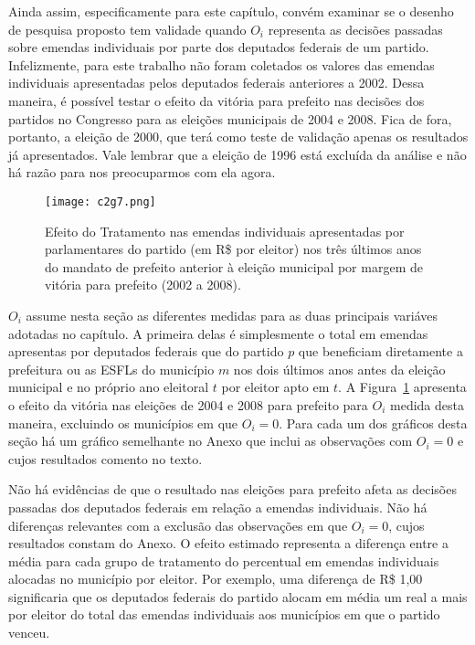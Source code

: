 Ainda assim, especificamente para este capítulo, convém examinar se o desenho de pesquisa proposto tem validade quando $O_{i}$ representa as decisões passadas sobre emendas individuais por parte dos deputados federais de um partido. Infelizmente, para este trabalho não foram coletados os valores das emendas individuais apresentadas pelos deputados federais anteriores a 2002. Dessa maneira, é possível testar o efeito da vitória para prefeito nas decisões dos partidos no Congresso para as eleições municipais de 2004 e 2008. Fica de fora, portanto, a eleição de 2000, que terá como teste de validação apenas os resultados já apresentados. Vale lembrar que a eleição de 1996 está excluída da análise e não há razão para nos preocuparmos com ela agora.

\begin{figure}[htp]
	\centering
	\texttt{[image: c2g7.png]}
	\caption{Efeito do Tratamento nas emendas individuais apresentadas por parlamentares do partido (em R\$ por eleitor) nos três últimos anos do mandato de prefeito anterior à eleição municipal por margem de vitória para prefeito (2002 a 2008).}
	\label{fig:c2g7}
\end{figure}

$O_{i}$ assume nesta seção as diferentes medidas para as duas principais variáves adotadas no capítulo. A primeira delas é simplesmente o total em emendas apresentas por deputados federais que do partido $p$ que beneficiam diretamente a prefeitura ou as ESFLs do município $m$ nos dois últimos anos antes da eleição municipal e no próprio ano eleitoral $t$ por eleitor apto em $t$. A Figura~\ref{fig:c2g7} apresenta o efeito da vitória nas eleições de 2004 e 2008 para prefeito para $O_{i}$ medida desta maneira, excluindo os municípios em que $O_{i}=0$. Para cada um dos gráficos desta seção há um gráfico semelhante no Anexo que inclui as observações com $O_{i}=0$ e cujos resultados comento no texto.

Não há evidências de que o resultado nas eleições para prefeito afeta as decisões passadas dos deputados federais em relação a emendas individuais. Não há diferenças relevantes com a exclusão das observações em que $O_{i}=0$, cujos resultados constam do Anexo. O efeito estimado representa a diferença entre a média para cada grupo de tratamento do percentual em emendas individuais alocadas no município por eleitor. Por exemplo, uma diferença de R\$ 1,00 significaria que os deputados federais do partido alocam em média um real a mais por eleitor do total das emendas individuais aos municípios em que o partido venceu.

